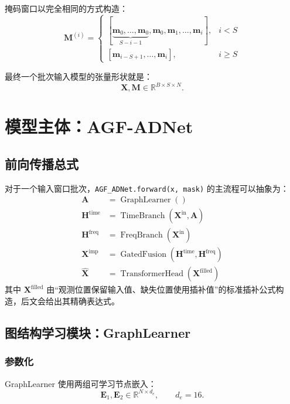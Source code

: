 \documentclass[UTF8]{ctexart}
\begin{document}
掩码窗口以完全相同的方式构造：
\begin{equation}
    \bm{M}^{(i)} =
    \begin{cases}
        [\underbrace{\bm{m}_0,\dots,\bm{m}_0}_{S-i-1},\bm{m}_0,\bm{m}_1,\dots,\bm{m}_i], & i < S \\
        [\bm{m}_{i-S+1}, \dots, \bm{m}_i], & i \ge S
    \end{cases}
\end{equation}

最终一个批次输入模型的张量形状就是：
\begin{equation}
    \bm{X}, \bm{M} \in \mathbb{R}^{B \times S \times N}.
\end{equation}

\section{模型主体：AGF-ADNet}

\subsection{前向传播总式}

对于一个输入窗口批次，\texttt{AGF\_ADNet.forward(x, mask)} 的主流程可以抽象为：
\begin{align}
    \bm{A} &= \operatorname{GraphLearner}() \\
    \bm{H}^{\text{time}} &= \operatorname{TimeBranch}(\bm{X}^{\text{in}}, \bm{A}) \\
    \bm{H}^{\text{freq}} &= \operatorname{FreqBranch}(\bm{X}^{\text{in}}) \\
    \bm{X}^{\text{imp}} &= \operatorname{GatedFusion}(\bm{H}^{\text{time}}, \bm{H}^{\text{freq}}) \\
    \hat{\bm{X}} &= \operatorname{TransformerHead}(\bm{X}^{\text{filled}})
\end{align}
其中 $\bm{X}^{\text{filled}}$ 由“观测位置保留输入值、缺失位置使用插补值”的标准插补公式构造，后文会给出其精确表达式。

\subsection{图结构学习模块：GraphLearner}

\subsubsection{参数化}

GraphLearner 使用两组可学习节点嵌入：
\begin{equation}
    \bm{E}_1, \bm{E}_2 \in \mathbb{R}^{N \times d_e}, \qquad d_e = 16.
\end{equation}
\end{document}
